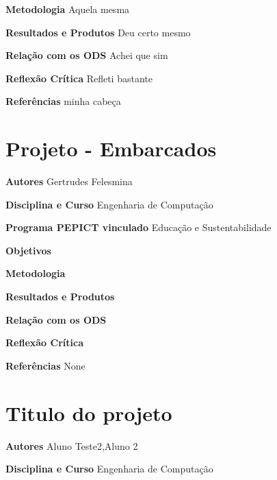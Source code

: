 \documentclass[12pt,openright,oneside,a4paper]{report}
\begin{document}
\vspace{0.7cm}
\noindent
\textbf{Metodologia}
Aquela mesma

\vspace{0.7cm}
\noindent
\textbf{Resultados e Produtos}
Deu certo mesmo

\vspace{0.7cm}
\noindent
\textbf{Relação com os ODS}
Achei que sim

\vspace{0.7cm}
\noindent
\textbf{Reflexão Crítica}
Refleti bastante

\vspace{0.7cm}
\noindent
\textbf{Referências}
minha cabeça

\vspace{0.7cm}
\section{Projeto - Embarcados}
\noindent
\textbf{Autores}
Gertrudes Felesmina

\vspace{0.7cm}
\noindent
\textbf{Disciplina e Curso}
Engenharia de Computação

\vspace{0.7cm}
\noindent
\textbf{Programa PEPICT vinculado}
Educação e Sustentabilidade

\vspace{0.7cm}
\noindent
\textbf{Objetivos}


\vspace{0.7cm}
\noindent
\textbf{Metodologia}


\vspace{0.7cm}
\noindent
\textbf{Resultados e Produtos}


\vspace{0.7cm}
\noindent
\textbf{Relação com os ODS}


\vspace{0.7cm}
\noindent
\textbf{Reflexão Crítica}


\vspace{0.7cm}
\noindent
\textbf{Referências}
None

\vspace{0.7cm}
\section{Titulo do projeto}
\noindent
\textbf{Autores}
Aluno Teste2,Aluno 2

\vspace{0.7cm}
\noindent
\textbf{Disciplina e Curso}
Engenharia de Computação
\end{document}
